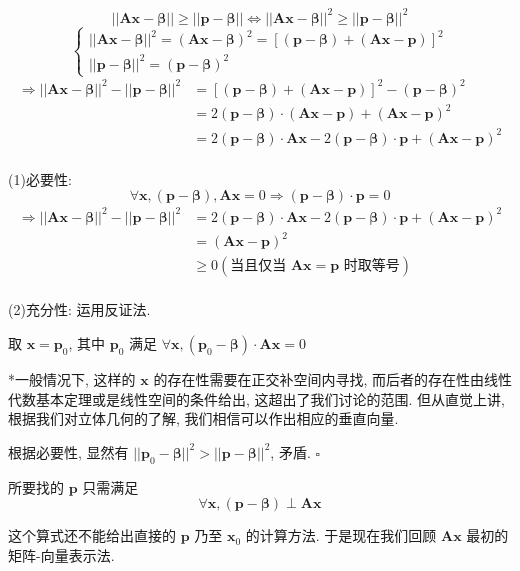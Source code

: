 \documentclass[UTF8]{ctexart}
\DeclareMathOperator{\0}{\mathbf{0}}
\DeclareMathOperator{\<}{\langle}
\renewcommand{\>}{\rangle}
\begin{document}
		\begin{prf}
			\[||\bm{A}\bm{x}-\bm{\beta}||\geq||\bm{p}-\bm{\beta}||\Longleftrightarrow||\bm{A}\bm{x}-\bm{\beta}||^2\geq||\bm{p}-\bm{\beta}||^2\]
			\[\begin{cases}
			||\bm{A}\bm{x}-\bm{\beta}||^2=(\bm{A}\bm{x}-\bm{\beta})^2=[(\bm{p}-\bm{\beta})+(\bm{A}\bm{x}-\bm{p})]^2\\
			||\bm{p}-\bm{\beta}||^2=(\bm{p}-\bm{\beta})^2
			\end{cases}\]
			\[\begin{aligned}
			\Longrightarrow||\bm{A}\bm{x}-\bm{\beta}||^2-||\bm{p}-\bm{\beta}||^2 & = [(\bm{p}-\bm{\beta})+(\bm{A}\bm{x}-\bm{p})]^2-(\bm{p}-\bm{\beta})^2\\
			& = 2(\bm{p}-\bm{\beta})\cdot(\bm{A}\bm{x}-\bm{p})+(\bm{A}\bm{x}-\bm{p})^2\\
			& = 2(\bm{p}-\bm{\beta})\cdot\bm{A}\bm{x}-2(\bm{p}-\bm{\beta})\cdot\bm{p}+(\bm{A}\bm{x}-\bm{p})^2\\
			\end{aligned}\]
			
			(1)必要性: 
				\[\forall\bm{x}, (\bm{p}-\bm{\beta}),\bm{A}\bm{x}=0\Longrightarrow(\bm{p}-\bm{\beta})\cdot\bm{p}=0\]
				\[\begin{aligned}
				\Longrightarrow||\bm{A}\bm{x}-\bm{\beta}||^2-||\bm{p}-\bm{\beta}||^2 & = 2(\bm{p}-\bm{\beta})\cdot\bm{A}\bm{x}-2(\bm{p}-\bm{\beta})\cdot\bm{p}+(\bm{A}\bm{x}-\bm{p})^2\\
				& = (\bm{A}\bm{x}-\bm{p})^2\\
				& \geq 0(\text{当且仅当 \(\bm{A}\bm{x}=\bm{p}\) 时取等号})\\
				\end{aligned}\]
				
			(2)充分性: 运用反证法. 
				
				取 \(\bm{x}=\bm{p}_0\), 其中 \(\bm{p}_0\) 满足 \(\forall\bm{x}, (\bm{p}_0-\bm{\beta})\cdot\bm{A}\bm{x}=0\) 
				
				*一般情况下, 这样的 \(\bm{x}\) 的存在性需要在正交补空间内寻找, 而后者的存在性由线性代数基本定理或是线性空间的 条件给出, 这超出了我们讨论的范围. 但从直觉上讲, 根据我们对立体几何的了解, 我们相信可以作出相应的垂直向量. 
				
				根据必要性, 显然有 \(||\bm{p}_0-\bm{\beta}||^2>||\bm{p}-\bm{\beta}||^2\), 矛盾.  \(\square\) 

				所要找的 \(\bm{p}\) 只需满足\[\forall\bm{x}, (\bm{p}-\bm{\beta})\perp\bm{A}\bm{x}\]
		
				这个算式还不能给出直接的 \(\bm{p}\) 乃至 \(\bm{x}_0\) 的计算方法. 于是现在我们回顾 \(\bm{A}\bm{x}\) 最初的矩阵-向量表示法. 
				

\end{prf}
\end{document}
